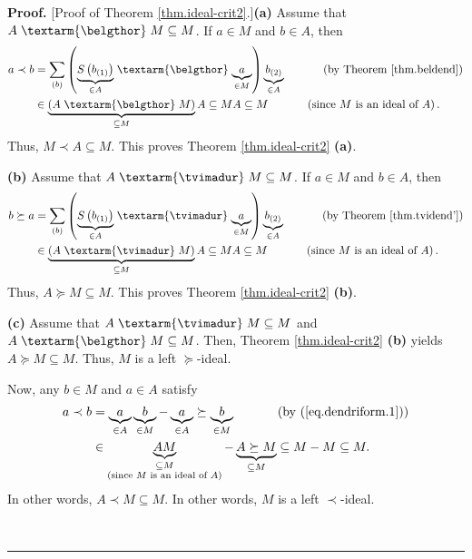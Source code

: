 \documentclass[numbers=enddot,12pt,final,onecolumn,notitlepage]{scrartcl}%
\theoremstyle{definition}
\newenvironment{proof}[1][Proof]{\noindent\textbf{#1.} }{\ \rule{0.5em}{0.5em}}
\newcommand{\tvi}{\left. \textarm{\tvimadur} \right.}
\newcommand{\bel}{\left. \textarm{\belgthor} \right.}
\let\sumnonlimits\sum
\renewcommand{\sum}{\sumnonlimits\limits}
\begin{document}
\begin{proof}
[Proof of Theorem \ref{thm.ideal-crit2}.]\textbf{(a)} Assume that
$A\bel  M\subseteq M$. If $a\in M$ and $b\in A$, then%
\begin{align*}
a\left.  \prec\right.  b  &  =\sum_{\left(  b\right)  }\left(
\underbrace{S\left(  b_{\left(  1\right)  }\right)  }_{\in A}%
\bel \underbrace{a}_{\in M}\right)  \underbrace{b_{\left(  2\right)  }}_{\in
A}\ \ \ \ \ \ \ \ \ \ \left(  \text{by Theorem \ref{thm.beldend}}\right) \\
&  \in\underbrace{\left(  A\bel M\right)  }_{\subseteq M}A\subseteq
MA\subseteq M\ \ \ \ \ \ \ \ \ \ \left(  \text{since }M\text{ is an ideal of
}A\right)  .
\end{align*}
Thus, $M\left.  \prec\right.  A\subseteq M$. This proves Theorem
\ref{thm.ideal-crit2} \textbf{(a)}.

\textbf{(b)} Assume that $A\tvi  M\subseteq M$. If $a\in M$ and $b\in A$, then%
\begin{align*}
b\left.  \succeq\right.  a  &  =\sum_{\left(  b\right)  }\left(
\underbrace{S\left(  b_{\left(  1\right)  }\right)  }_{\in A}%
\tvi \underbrace{a}_{\in M}\right)  \underbrace{b_{\left(  2\right)  }}_{\in
A}\ \ \ \ \ \ \ \ \ \ \left(  \text{by Theorem \ref{thm.tvidend'}}\right) \\
&  \in\underbrace{\left(  A\tvi M\right)  }_{\subseteq M}A\subseteq
MA\subseteq M\ \ \ \ \ \ \ \ \ \ \left(  \text{since }M\text{ is an ideal of
}A\right)  .
\end{align*}
Thus, $A\left.  \succeq\right.  M\subseteq M$. This proves Theorem
\ref{thm.ideal-crit2} \textbf{(b)}.

\textbf{(c)} Assume that $A\tvi  M\subseteq M$ and $A\bel  M\subseteq M$.
Then, Theorem \ref{thm.ideal-crit2} \textbf{(b)} yields $A\left.
\succeq\right.  M\subseteq M$. Thus, $M$ is a left $\left.  \succeq\right.  $-ideal.

Now, any $b\in M$ and $a\in A$ satisfy%
\begin{align*}
a\left.  \prec\right.  b  &  =\underbrace{a}_{\in A}\underbrace{b}_{\in
M}-\underbrace{a}_{\in A}\left.  \succeq\right.  \underbrace{b}_{\in
M}\ \ \ \ \ \ \ \ \ \ \left(  \text{by (\ref{eq.dendriform.1})}\right) \\
&  \in\underbrace{AM}_{\substack{\subseteq M\\\text{(since }M\text{ is an
ideal of }A\text{)}}}-\underbrace{A\left.  \succeq\right.  M}_{\subseteq
M}\subseteq M-M\subseteq M.
\end{align*}
In other words, $A\left.  \prec\right.  M\subseteq M$. In other words, $M$ is
a left $\left.  \prec\right.  $-ideal.


\end{proof}
\end{document}
